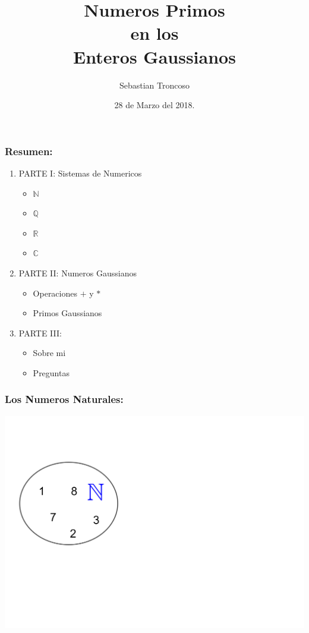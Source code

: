 \documentclass{beamer}
\title[Primos guassianos]{Numeros Primos\\ en los\\ Enteros Gaussianos}
\author[Sebastian Troncoso]{Sebastian Troncoso}
\institute[BSC]{Birmingham-Southern College}
\date[28 de Marzo]{ 28 de Marzo del 2018. \\ \vspace{1cm} }
\def\CC{{\mathbb C}}
\def\NN{{\mathbb N}}
\def\QQ{{\mathbb Q}}
\def\RR{{\mathbb R}}
\theoremstyle{thmstyle}
\theoremstyle{thmstyle}
\theoremstyle{thmstyle}
\theoremstyle{mystyle}
\theoremstyle{qstnstyle}
\begin{document}
\begin{frame}
\titlepage
\end{frame}

\begin{frame}
\frametitle{Resumen:}

\begin{enumerate}
\item PARTE I: Sistemas de Numericos
\begin{itemize}
\item $\NN$
\item $\QQ$
\item $\RR$
\item $\CC$
\end{itemize}

\pause
\item PARTE II: Numeros Gaussianos
\begin{itemize}
\item Operaciones $+$ y $*$
\item Primos Gaussianos
\end{itemize}

\pause
\item PARTE III: 
\begin{itemize}
\item Sobre mi

\item Preguntas
\end{itemize}
\end{enumerate}
\end{frame}

\begin{frame}
\frametitle{Los Numeros Naturales:}
\begin{center}
\includegraphics[width=\linewidth]{Image1.png}
\end{center}
\end{frame}
\end{document}
